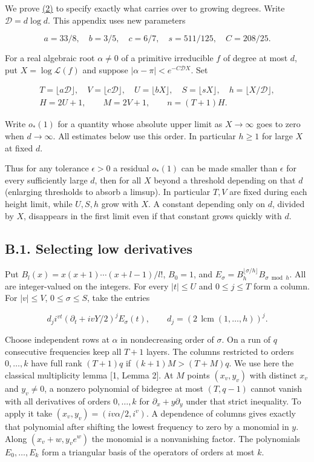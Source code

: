 \documentclass[11pt,a4paper]{article}
\begin{document}
We prove \hyperref[eq:2]{(2)} to specify exactly what carries over to growing degrees. Write \(\mathscr D=d\log d\). This appendix uses new parameters

\[
 a=33/8,\quad b=3/5,\quad c=6/7,\quad s=511/125,\quad C=208/25 .
\]

For a real algebraic root \(\alpha\ne0\) of a primitive irreducible \(f\) of degree at most \(d\), put \(X=\log\mathcal L(f)\) and suppose \(|\alpha-\pi|<e^{-C\mathscr D X}\). Set

\[
 \begin{gathered}
 T=\lfloor a\mathscr D\rfloor,\quad V=\lfloor c\mathscr D\rfloor,\quad
 U=\lfloor bX\rfloor,\quad S=\lfloor sX\rfloor,\quad h=\lfloor X/\mathscr D\rfloor,\\
 H=2U+1,\qquad M=2V+1,\qquad n=(T+1)H .
 \end{gathered}
\]

Write \(o_*(1)\) for a quantity whose absolute upper limit as \(X\to\infty\) goes to zero when \(d\to\infty\). All estimates below use this order. In particular \(h\ge1\) for large \(X\) at fixed \(d\).

Thus for any tolerance \(\epsilon>0\) a residual \(o_*(1)\) can be made smaller than \(\epsilon\) for every sufficiently large \(d\), then for all \(X\) beyond a threshold depending on that \(d\) (enlarging thresholds to absorb a limsup). In particular \(T,V\) are fixed during each height limit, while \(U,S,h\) grow with \(X\). A constant depending only on \(d\), divided by \(X\), disappears in the first limit even if that constant grows quickly with \(d\).

\subsection{B.1. Selecting low derivatives}\label{b.1.-selecting-low-derivatives}

Put \(B_l(x)=x(x+1)\cdots(x+l-1)/l!\), \(B_0=1\), and \(E_\sigma=B_h^{\lfloor\sigma/h\rfloor}B_{\sigma\bmod h}\). All are integer-valued on the integers. For every \(|t|\le U\) and \(0\le j\le T\) form a column. For \(|v|\le V\), \(0\le\sigma\le S\), take the entries

\[
 d_j i^{vt}(\partial_t+ivY/2)^jE_\sigma(t),\qquad
 d_j=(2\,\operatorname{lcm}(1,\ldots,h))^j .                              \tag{28}\label{eq:28}
\]

Choose independent rows at \(\alpha\) in nondecreasing order of \(\sigma\). On a run of \(q\) consecutive frequencies keep all \(T+1\) layers. The columns restricted to orders \(0,\ldots,k\) have full rank \((T+1)q\) if \((k+1)M>(T+M)q\). We use here the classical multiplicity lemma {[}1, Lemma 2{]}. At \(M\) points \((x_v,y_v)\) with distinct \(x_v\) and \(y_v\ne0\), a nonzero polynomial of bidegree at most \((T,q-1)\) cannot vanish with all derivatives of orders \(0,\ldots,k\) for \(\partial_x+y\partial_y\) under that strict inequality. To apply it take \((x_v,y_v)=(iv\alpha/2,i^v)\). A dependence of columns gives exactly that polynomial after shifting the lowest frequency to zero by a monomial in \(y\). Along \((x_v+w,y_ve^w)\) the monomial is a nonvanishing factor. The polynomials \(E_0,\ldots,E_k\) form a triangular basis of the operators of orders at most \(k\).
\end{document}
